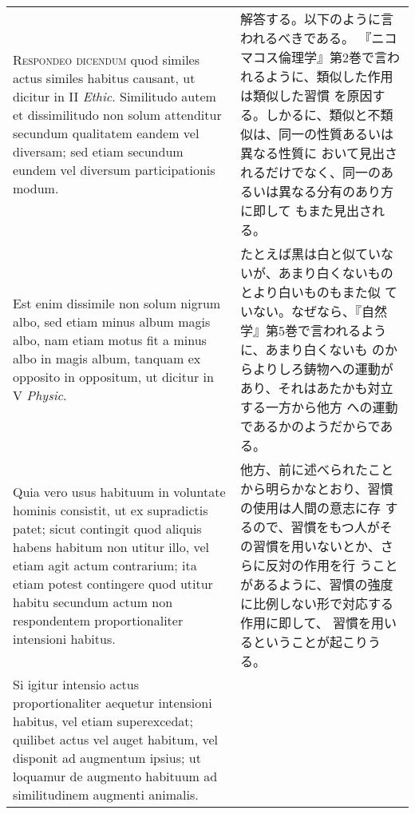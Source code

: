 \documentclass[10pt]{jsarticle} %
\begin{document}
\begin{longtable}{p{21em}p{21em}}
\\



{\scshape Respondeo dicendum} quod similes actus similes habitus causant, ut
dicitur in II {\itshape Ethic}. Similitudo autem et dissimilitudo non solum
attenditur secundum qualitatem eandem vel diversam; sed etiam secundum
eundem vel diversum participationis modum. 


&

解答する。以下のように言われるべきである。
『ニコマコス倫理学』第2巻で言われるように、類似した作用は類似した習慣
 を原因する。しかるに、類似と不類似は、同一の性質あるいは異なる性質に
 おいて見出されるだけでなく、同一のあるいは異なる分有のあり方に即して
 もまた見出される。

\\


Est enim dissimile non
solum nigrum albo, sed etiam minus album magis albo, nam etiam motus
fit a minus albo in magis album, tanquam ex opposito in oppositum, ut
dicitur in V {\itshape Physic}. 



&

たとえば黒は白と似ていないが、あまり白くないものとより白いものもまた似
 ていない。なぜなら、『自然学』第5巻で言われるように、あまり白くないも
 のからよりしろ鋳物への運動があり、それはあたかも対立する一方から他方
 への運動であるかのようだからである。

\\

Quia vero usus habituum in voluntate hominis
consistit, ut ex supradictis patet; sicut contingit quod aliquis
habens habitum non utitur illo, vel etiam agit actum contrarium; ita
etiam potest contingere quod utitur habitu secundum actum non
respondentem proportionaliter intensioni habitus. 



&

他方、前に述べられたことから明らかなとおり、習慣の使用は人間の意志に存
 するので、習慣をもつ人がその習慣を用いないとか、さらに反対の作用を行
 うことがあるように、習慣の強度に比例しない形で対応する作用に即して、
 習慣を用いるということが起こりうる。

\\

Si igitur intensio
actus proportionaliter aequetur intensioni habitus, vel etiam
superexcedat; quilibet actus vel auget habitum, vel disponit ad
augmentum ipsius; ut loquamur de augmento habituum ad similitudinem
augmenti animalis. 




\end{longtable}
\end{document}
